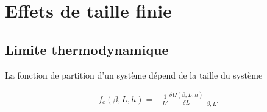 \chapter{Effets de taille finie}
    \label{chap-sos}
	
\section{Limite thermodynamique}

La fonction de partition d'un système dépend de la taille du système 
	
\begin{align}
    f_c(\beta,L,h) = - \frac{1}{L'} \frac{\delta \Omega(\beta,L,h)}{\delta L} \bigg|_{\beta,L'}
    \label{casimir-interface}
\end{align}

